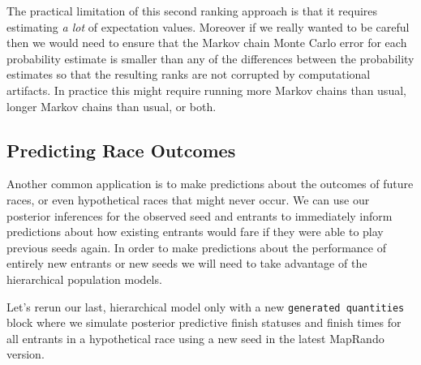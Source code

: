 \documentclass[
  letterpaper,
  DIV=11,
  numbers=noendperiod]{scrartcl}
\begin{document}
The practical limitation of this second ranking approach is that it
requires estimating \emph{a lot} of expectation values. Moreover if we
really wanted to be careful then we would need to ensure that the Markov
chain Monte Carlo error for each probability estimate is smaller than
any of the differences between the probability estimates so that the
resulting ranks are not corrupted by computational artifacts. In
practice this might require running more Markov chains than usual,
longer Markov chains than usual, or both.

\subsection{Predicting Race Outcomes}\label{predicting-race-outcomes}

Another common application is to make predictions about the outcomes of
future races, or even hypothetical races that might never occur. We can
use our posterior inferences for the observed seed and entrants to
immediately inform predictions about how existing entrants would fare if
they were able to play previous seeds again. In order to make
predictions about the performance of entirely new entrants or new seeds
we will need to take advantage of the hierarchical population models.

Let's rerun our last, hierarchical model only with a new
\texttt{generated\ quantities} block where we simulate posterior
predictive finish statuses and finish times for all entrants in a
hypothetical race using a new seed in the latest MapRando version.
\end{document}
